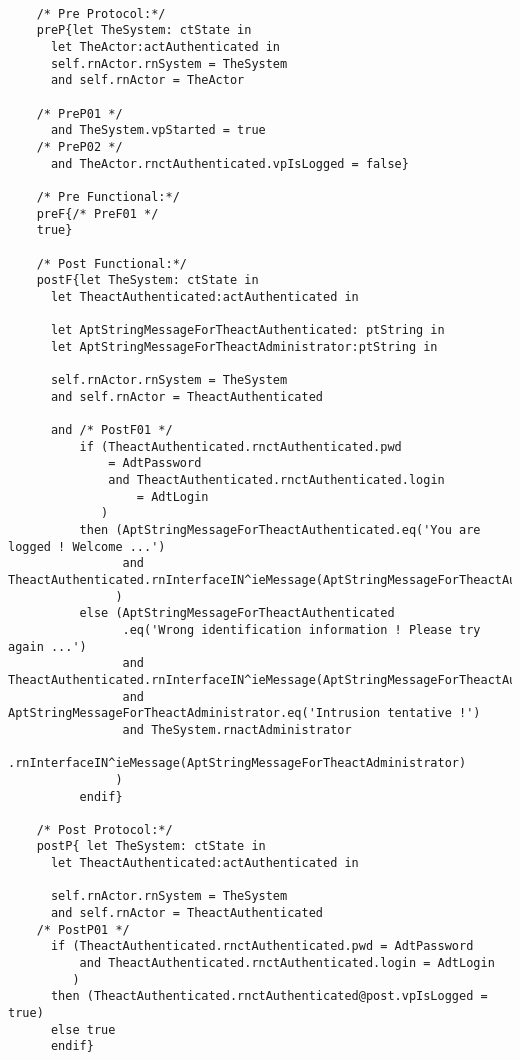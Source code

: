 	\scriptsize
	\vspace{0.5cm}
	\begin{lstlisting}[style=MessirStyle,firstnumber=auto,captionpos=b,caption={\msrmessir (MCL-oriented) specification of the operation \emph{oeLogin}.},label=OM-actAuthenticated-oeLogin-MCL-LST]

	/* Pre Protocol:*/ 
	preP{let TheSystem: ctState in
	  let TheActor:actAuthenticated in
	  self.rnActor.rnSystem = TheSystem
	  and self.rnActor = TheActor
	  
	/* PreP01 */
	  and TheSystem.vpStarted = true
	/* PreP02 */
	  and TheActor.rnctAuthenticated.vpIsLogged = false}
	
	/* Pre Functional:*/
	preF{/* PreF01 */
	true}
	
	/* Post Functional:*/ 
	postF{let TheSystem: ctState in
	  let TheactAuthenticated:actAuthenticated in
	
	  let AptStringMessageForTheactAuthenticated: ptString in
	  let AptStringMessageForTheactAdministrator:ptString in
	  
	  self.rnActor.rnSystem = TheSystem
	  and self.rnActor = TheactAuthenticated
	  
	  and /* PostF01 */
	      if (TheactAuthenticated.rnctAuthenticated.pwd
	          = AdtPassword
	          and TheactAuthenticated.rnctAuthenticated.login
	              = AdtLogin
	         )
	      then (AptStringMessageForTheactAuthenticated.eq('You are logged ! Welcome ...')
	            and TheactAuthenticated.rnInterfaceIN^ieMessage(AptStringMessageForTheactAuthenticated)
	           )
	      else (AptStringMessageForTheactAuthenticated
	            .eq('Wrong identification information ! Please try again ...')
	            and TheactAuthenticated.rnInterfaceIN^ieMessage(AptStringMessageForTheactAuthenticated)
	            and AptStringMessageForTheactAdministrator.eq('Intrusion tentative !')
	            and TheSystem.rnactAdministrator
	                .rnInterfaceIN^ieMessage(AptStringMessageForTheactAdministrator)
	           )
	      endif}
	
	/* Post Protocol:*/ 
	postP{ let TheSystem: ctState in
	  let TheactAuthenticated:actAuthenticated in
	
	  self.rnActor.rnSystem = TheSystem
	  and self.rnActor = TheactAuthenticated
	/* PostP01 */
	  if (TheactAuthenticated.rnctAuthenticated.pwd = AdtPassword
	      and TheactAuthenticated.rnctAuthenticated.login = AdtLogin
	     )
	  then (TheactAuthenticated.rnctAuthenticated@post.vpIsLogged = true)
	  else true
	  endif}
	
	\end{lstlisting}
	\normalsize 
	
	
	
	





